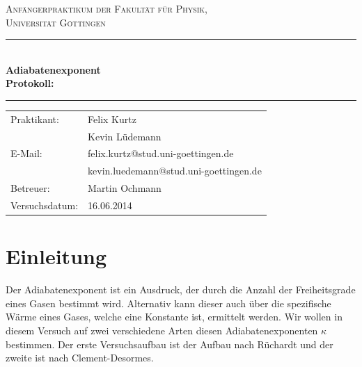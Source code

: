 \documentclass[12pt,a4paper,titlepage,headinclude,bibtotoc]{scrartcl}
\begin{document}
\begin{titlepage}
\centering
\textsc{\Large Anfängerpraktikum der Fakultät für
  Physik,\\[1.5ex] Universität Göttingen}

\vspace*{4.2cm}

\rule{\textwidth}{1pt}\\[0.5cm]
{\huge \bfseries
  Adiabatenexponent\\[1.5ex]
  Protokoll:}\\[0.5cm]
\rule{\textwidth}{1pt}

\vspace*{3.0cm}

\begin{Large}
\begin{tabular}{ll}
Praktikant:
 	&  Felix Kurtz\\
	&  Kevin Lüdemann\\

  E-Mail: 
	&  felix.kurtz@stud.uni-goettingen.de\\
	&  kevin.luedemann@stud.uni-goettingen.de\\

 Betreuer: & Martin Ochmann\\
 Versuchsdatum: & 16.06.2014\\
\end{tabular}
\end{Large}

\vspace*{0.8cm}

\begin{Large}
\end{Large}

\end{titlepage}

\tableofcontents

\newpage

\section{Einleitung}
\label{sec:einleitung}
Der Adiabatenexponent ist ein Ausdruck, der durch die Anzahl der Freiheitsgrade eines Gasen bestimmt wird. 
Alternativ kann dieser auch über die spezifische Wärme eines Gases, welche eine Konstante ist, ermittelt werden.
Wir wollen in diesem Versuch auf zwei verschiedene Arten diesen Adiabatenexponenten $\kappa$ bestimmen.
Der erste Versuchsaufbau ist der Aufbau nach Rüchardt und der zweite ist nach Clement-Desormes.
\end{document}
